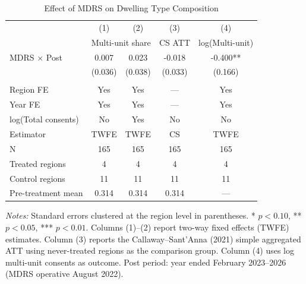 \begin{table}[H]
\centering
\caption{Effect of MDRS on Dwelling Type Composition}
\label{tab:main}
\begin{threeparttable}
\begin{tabular}{lcccc}
\toprule
 & (1) & (2) & (3) & (4) \\
 & \multicolumn{2}{c}{Multi-unit share} & CS ATT & log(Multi-unit) \\
\midrule
MDRS $\times$ Post & 0.007 & 0.023 & -0.018 & -0.400** \\
 & (0.036) & (0.038) & (0.033) & (0.166) \\
\\
Region FE & Yes & Yes & --- & Yes \\
Year FE & Yes & Yes & --- & Yes \\
log(Total consents) & No & Yes & No & No \\
Estimator & TWFE & TWFE & CS & TWFE \\
N & 165 & 165 & 165 & 165 \\
Treated regions & 4 & 4 & 4 & 4 \\
Control regions & 11 & 11 & 11 & 11 \\
Pre-treatment mean & 0.314 & 0.314 & 0.314 & --- \\
\bottomrule
\end{tabular}
\begin{tablenotes}[flushleft]
\small
\item \textit{Notes:} Standard errors clustered at the region level in parentheses. * $p<0.10$, ** $p<0.05$, *** $p<0.01$. Columns (1)--(2) report two-way fixed effects (TWFE) estimates. Column (3) reports the Callaway--Sant'Anna (2021) simple aggregated ATT using never-treated regions as the comparison group. Column (4) uses log multi-unit consents as outcome. Post period: year ended February 2023--2026 (MDRS operative August 2022).
\end{tablenotes}
\end{threeparttable}
\end{table}
